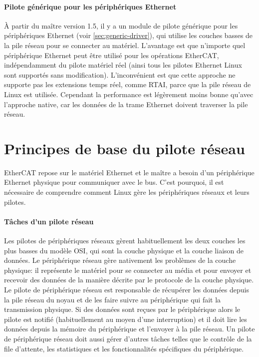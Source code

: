\documentclass[a4paper,12pt,BCOR=6mm,bibtotoc,idxtotoc]{scrbook}
\begin{document}
\paragraph{Pilote g\'en\'erique pour les p\'eriph\'eriques Ethernet}
\`A partir du ma\^itre version 1.5, il y a un module de pilote
g\'en\'erique pour les p\'eriph\'eriques Ethernet (voir
\autoref{sec:generic-driver}), qui utilise les couches basses de la
pile r\'eseau pour se connecter au mat\'eriel. L'avantage est que
n'importe quel p\'eriph\'erique Ethernet peut \^etre utilis\'e pour les
op\'erations EtherCAT, ind\'ependamment du pilote mat\'eriel r\'eel
(ainsi tous les pilotes Ethernet Linux sont support\'es sans
modification). L'inconv\'enient est que cette approche ne supporte
pas les extensions temps r\'eel, comme RTAI, parce que la pile
r\'eseau de Linux est utilis\'ee. Cependant la performance est
l\'eg\`erement moins bonne qu'avec l'approche native, car les donn\'ees
de la trame Ethernet doivent traverser la pile r\'eseau.


\section{Principes de base du pilote r\'eseau}
\label{sec:networkdrivers}

EtherCAT repose sur le mat\'eriel Ethernet et le ma\^itre a besoin d'un
p\'eriph\'erique Ethernet physique pour communiquer avec le bus.
C'est pourquoi, il est n\'ecessaire de comprendre comment Linux g\`ere
les p\'eriph\'eriques r\'eseaux et leurs pilotes.

\paragraph{T\^aches d'un pilote r\'eseau}
Les pilotes de p\'eriph\'eriques r\'eseaux g\`erent habituellement les
deux couches les plus basses du mod\`ele OSI, qui sont la couche
physique et la couche liaison de donn\'ees.  Le p\'eriph\'erique
r\'eseau g\`ere nativement les probl\`emes de la couche physique: il
repr\'esente le mat\'eriel pour se connecter au m\'edia et pour
envoyer et recevoir des donn\'ees de la mani\`ere d\'ecrite par le
protocole de la couche physique.  Le pilote de p\'eriph\'erique
r\'eseau est responsable de r\'ecup\'erer les donn\'ees depuis la pile
r\'eseau du noyau et de les faire suivre au p\'eriph\'erique qui fait
la transmission physique.  Si des donn\'ees sont re\c{c}ues par le
p\'eriph\'erique alors le pilote est notifi\'e (habituellement au moyen
d'une interruption) et il doit lire les donn\'ees depuis la m\'emoire
du p\'eriph\'erique et l'envoyer \`a la pile r\'eseau.  Un pilote de
p\'eriph\'erique r\'eseau doit aussi g\'erer d'autres t\^aches telles
que le contr\^ole de la file d'attente, les statistiques et les
fonctionnalit\'es sp\'ecifiques du p\'eriph\'erique.
\end{document}
